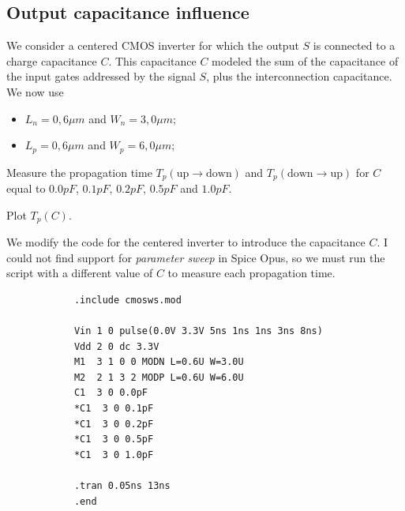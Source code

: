 \documentclass[../main.tex]{subfiles}
\begin{document}
	\subsection{Output capacitance influence}
	{
		\begin{tcolorbox}[colback=gray!5!white,colframe=gray!75!black]
			We consider a centered CMOS inverter for which the output $S$ is connected to a charge capacitance $C$. This capacitance $C$ modeled the sum of the capacitance of the input gates addressed by the signal $S$, plus the interconnection capacitance. We now use
			\begin{itemize}
				\item $L_n = 0,6 \mu m$ and $W_n = 3,0 \mu m$;
				\item $L_p = 0,6 \mu m$ and $W_p = 6,0 \mu m$;
			\end{itemize}
			Measure the propagation time $T_p(\text{up} \to \text{down})$ and $T_p(\text{down} \to \text{up})$ for $C$ equal to $0.0pF$, $0.1pF$, $0.2pF$, $0.5pF$ and $1.0pF$.
			
			Plot $T_p(C)$.
		\end{tcolorbox}
		
		We modify the code for the centered inverter to introduce the capacitance $C$. I could not find support for \textit{parameter sweep} in Spice Opus, so we must run the script with a different value of $C$ to measure each propagation time.
		
		\begin{lstlisting}
			.include cmosws.mod
			
			Vin 1 0 pulse(0.0V 3.3V 5ns 1ns 1ns 3ns 8ns)
			Vdd 2 0 dc 3.3V
			M1  3 1 0 0 MODN L=0.6U W=3.0U
			M2  2 1 3 2 MODP L=0.6U W=6.0U
			C1  3 0 0.0pF
			*C1  3 0 0.1pF
			*C1  3 0 0.2pF
			*C1  3 0 0.5pF
			*C1  3 0 1.0pF
			
			.tran 0.05ns 13ns
			.end
		\end{lstlisting}
		
}
\end{document}

